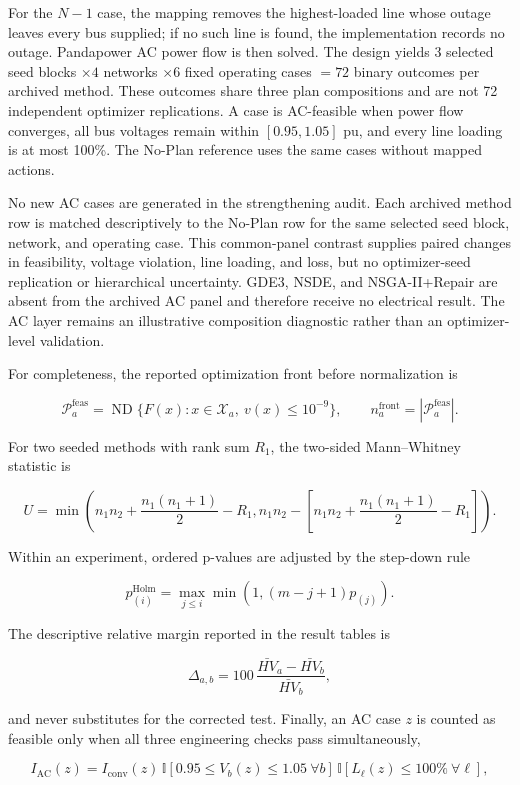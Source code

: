 \documentclass[energies,article,submit,moreauthors]{Definitions/mdpi}
\begin{document}
For the \(N-1\) case, the mapping removes the highest-loaded line whose outage leaves every bus supplied; if no such line is found, the implementation records no outage. Pandapower AC power flow \cite{ref7} is then solved. The design yields \(3\) selected seed blocks \(\times4\) networks \(\times6\) fixed operating cases \(=72\) binary outcomes per archived method. These outcomes share three plan compositions and are not 72 independent optimizer replications. A case is AC-feasible when power flow converges, all bus voltages remain within \([0.95,1.05]\) pu, and every line loading is at most 100\%. The No-Plan reference uses the same cases without mapped actions.

No new AC cases are generated in the strengthening audit. Each archived method row is matched descriptively to the No-Plan row for the same selected seed block, network, and operating case. This common-panel contrast supplies paired changes in feasibility, voltage violation, line loading, and loss, but no optimizer-seed replication or hierarchical uncertainty. GDE3, NSDE, and NSGA-II+Repair are absent from the archived AC panel and therefore receive no electrical result. The AC layer remains an illustrative composition diagnostic rather than an optimizer-level validation.

For completeness, the reported optimization front before normalization is

\[
\mathcal P_a^{\mathrm{feas}}=
\operatorname{ND}\{F(x):x\in\mathcal X_a,\ v(x)\leq10^{-9}\},
\qquad n_a^{\mathrm{front}}=|\mathcal P_a^{\mathrm{feas}}|.
\]

For two seeded methods with rank sum \(R_1\), the two-sided Mann--Whitney statistic is

\[
U=\min\!\left(n_1n_2+\frac{n_1(n_1+1)}{2}-R_1,
n_1n_2-\left[n_1n_2+\frac{n_1(n_1+1)}{2}-R_1\right]\right).
\]

Within an experiment, ordered p-values are adjusted by the step-down rule

\[
p^{\mathrm{Holm}}_{(i)}=
\max_{j\leq i}\min\!\left(1,(m-j+1)p_{(j)}\right).
\]

The descriptive relative margin reported in the result tables is

\[
\Delta_{a,b}=100\,\frac{\bar{HV}_a-\bar{HV}_b}{\bar{HV}_b},
\]

and never substitutes for the corrected test. Finally, an AC case \(z\) is counted as feasible only when all three engineering checks pass simultaneously,

\[
I_{\mathrm{AC}}(z)=
I_{\mathrm{conv}}(z)\,
\mathbb I[0.95\leq V_b(z)\leq1.05\ \forall b]\,
\mathbb I[L_\ell(z)\leq100\%\ \forall\ell],
\]
\end{document}

